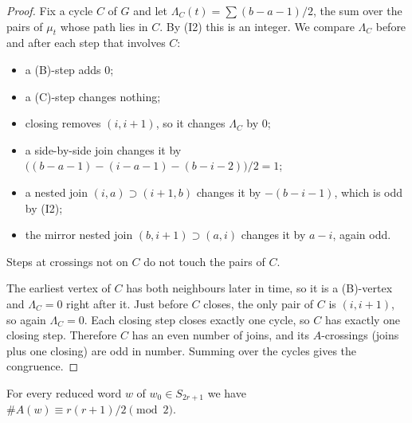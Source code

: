 \begin{proof}
Fix a cycle $C$ of $G$ and let $\Lambda_C(t)=\sum (b-a-1)/2$, the sum over the pairs of $\mu_t$ whose
path lies in $C$. By (I2) this is an integer. We compare $\Lambda_C$ before and after each step that
involves $C$:
\begin{itemize}
\item a (B)-step adds $0$;
\item a (C)-step changes nothing;
\item closing removes $(i,i+1)$, so it changes $\Lambda_C$ by $0$;
\item a side-by-side join changes it by $\bigl((b-a-1)-(i-a-1)-(b-i-2)\bigr)/2=1$;
\item a nested join $(i,a)\supset(i+1,b)$ changes it by $-(b-i-1)$, which is odd by (I2);
\item the mirror nested join $(b,i+1)\supset(a,i)$ changes it by $a-i$, again odd.
\end{itemize}
Steps at crossings not on $C$ do not touch the pairs of $C$.

The earliest vertex of $C$ has both neighbours later in time, so it is a (B)-vertex and
$\Lambda_C=0$ right after it. Just before $C$ closes, the only pair of $C$ is $(i,i+1)$, so again
$\Lambda_C=0$. Each closing step closes exactly one cycle, so $C$ has exactly one closing step.
Therefore $C$ has an even number of joins, and its $A$-crossings (joins plus one closing) are odd in
number. Summing over the cycles gives the congruence.
\end{proof}

\begin{lemma}\label{lem:A}
For every reduced word $w$ of $w_0\in S_{2r+1}$ we have $\#A(w)\equiv r(r+1)/2\pmod 2$.
\end{lemma}

